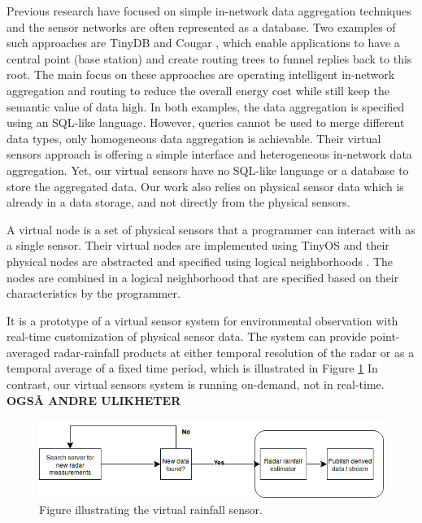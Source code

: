 \documentclass[USenglish]{uit-thesis}
\begin{document}
Previous research have focused on simple in-network data aggregation techniques and the sensor networks are often represented as a database. Two examples of such approaches are TinyDB \cite{tinyDB} and Cougar \cite{cougar}, which enable applications to have a central point (base station) and create routing trees  to funnel replies back to this root. The main focus on these approaches are operating intelligent in-network aggregation and routing to reduce  the overall energy cost while still keep the semantic value of data high.
In both examples, the data aggregation is specified using an SQL-like language. However, queries cannot be used to merge different data types, only homogeneous data aggregation is achievable.
Their virtual sensors approach is  offering a simple interface and heterogeneous in-network data aggregation. Yet, our virtual sensors have no SQL-like language or a database to store the aggregated data. Our work also relies on physical sensor data which is already in a data storage, and not directly from the physical sensors.


A virtual node\cite{Ciciriello} is a set of physical sensors that a programmer can interact with as a single sensor. Their virtual nodes are implemented using TinyOS \cite{TinyOS} and their physical nodes are abstracted and specified using logical neighborhoods \cite{Mottola2006}\cite{Mottola2006_2}. The nodes are combined in a logical neighborhood that are specified based on their characteristics by the programmer. 


It is a prototype of a virtual sensor system for environmental observation with real-time customization of physical sensor data. 
The system can provide point-averaged radar-rainfall products at either temporal resolution of the radar or as a temporal average of a fixed time period, which is illustrated in Figure \ref{fig:rainfall_sensor}
In contrast, our virtual sensors system is running on-demand, not in real-time. \textbf{OGSÅ ANDRE ULIKHETER}

\begin{figure}
\centering
\includegraphics[width=\textwidth]{rainfall_sensor.png}
\caption{Figure illustrating the virtual rainfall sensor.}
\label{fig:rainfall_sensor}
\end{figure}
\end{document}
